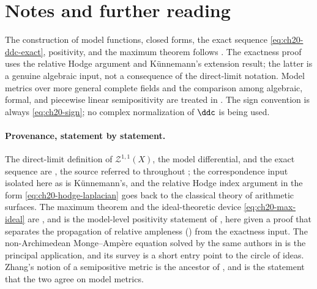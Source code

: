 \section*{Notes and further reading}

The construction of model functions, closed forms, the exact sequence
\eqref{eq:ch20-ddc-exact}, positivity, and the maximum theorem follows
\cite[Sections~2, 4, and~5]{BFJ16}.  The exactness proof uses the relative
Hodge argument and K\"unnemann's extension result; the latter is a genuine
algebraic input, not a consequence of the direct-limit notation.  Model
metrics over more general complete fields and the comparison among
algebraic, formal, and piecewise linear semipositivity are treated in
\cite{GM19}.  The sign convention is always
\eqref{eq:ch20-sign}; no complex normalization of \(\ddc\) is being used.

\paragraph{Provenance, statement by statement.}
The direct-limit definition of \(\mathcal Z^{1,1}(X)\), the model
differential, and the exact sequence are \cite[\S\S2 and 4]{BFJ16}, the
source referred to throughout ; the correspondence input
isolated here as  is K\"unnemann's, and the
relative Hodge index argument in the form
\eqref{eq:ch20-hodge-laplacian} goes back to the classical theory of
arithmetic surfaces.  The maximum theorem
 and the ideal-theoretic device
\eqref{eq:ch20-max-ideal} are \cite[\S5]{BFJ16}, and
 is the model-level positivity
statement of \cite[\S1]{BFJ16}, here given a proof that separates the
propagation of relative ampleness () from
the exactness input.  The non-Archimedean
Monge--Amp\`ere equation solved by the same authors in \cite{BFJ15} is the
principal application, and its survey \cite{BFJ16b} is a short entry point
to the circle of ideas.  Zhang's notion of a semipositive metric
\cite{Zhang1995} is the ancestor of , and
 is the statement that the two agree on
model metrics.


